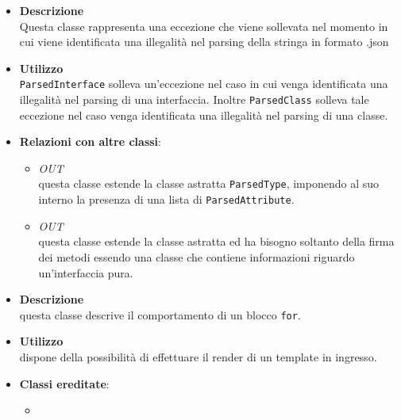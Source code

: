 \label{\nogloxy{swedesigner::server::project::ParsedException}}
\begin{itemize}
\item \textbf{Descrizione}\\
Questa classe rappresenta una eccezione che viene sollevata nel momento in cui viene identificata una illegalità nel parsing della stringa in formato .json
\item \textbf{Utilizzo}\\
\texttt{ParsedInterface} solleva un'eccezione nel caso in cui venga identificata una illegalità nel parsing di una interfaccia. Inoltre \texttt{ParsedClass} solleva tale eccezione nel caso venga identificata una illegalità nel parsing di una classe.
\item \textbf{Relazioni con altre classi}:
\begin{itemize}
\item \textit{OUT} \hyperref[\nogloxy{swedesigner::server::project::ParsedClass}]{}\\
questa classe estende la classe astratta \texttt{ParsedType}, imponendo al suo interno la presenza di una lista di \texttt{ParsedAttribute}. 
\item \textit{OUT} \hyperref[\nogloxy{swedesigner::server::project::ParsedInterface}]{}\\
questa classe estende la classe astratta  ed ha bisogno soltanto della firma dei metodi essendo una classe che contiene informazioni riguardo un'interfaccia pura.
\end{itemize}
\end{itemize}

\label{\nogloxy{swedesigner::server::project::ParsedFor}}
\begin{itemize}
\item \textbf{Descrizione}\\
questa classe descrive il comportamento di un blocco \texttt{for}.
\item \textbf{Utilizzo}\\
dispone della possibilità di effettuare il render di un template in ingresso.
\item \textbf{Classi ereditate}:
\begin{itemize}
\item \hyperref[\nogloxy{swedesigner::server::project::ParsedInstruction}]{}
\end{itemize}
\end{itemize}

